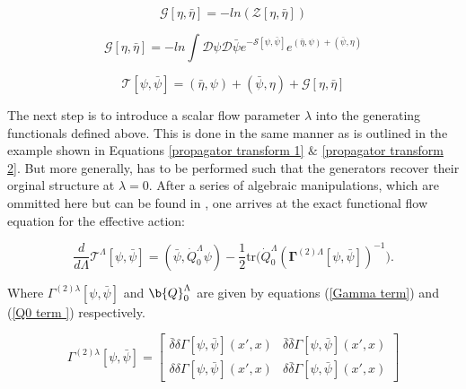 \documentclass[12pt]{article}
\begin{document}
\begin{equation} \label{Greens function functional}
    \mathcal{G}[\eta, \bar{\eta}] = -ln(\mathcal{Z}[\eta, \bar{\eta}])
\end{equation}

\begin{equation}\label{G term in effective action}
    \mathcal{G}[\eta, \bar{\eta}] = 
    -ln \int{\mathcal{D}\psi \mathcal{D} \bar{\psi}e^{-\mathcal{S}[\psi, \bar{\psi}]}e^{(\bar{\eta}, \psi) +(\bar{\psi}, \eta)}}
\end{equation}

\begin{equation} \label{Effective action}
    \mathcal{T}[\psi, \bar{\psi}] = (\bar{\eta},\psi) + (\bar{\psi},\eta) + \mathcal{G}[\eta, \bar{\eta}]
\end{equation}


\noindent The next step is to introduce a scalar flow parameter $\lambda$ into the generating functionals defined above. This is done in the same manner as is outlined in the example shown in Equations \ref{propagator transform 1} $\&$ \ref{propagator transform 2}. 
But more generally, has to be performed such that the generators recover their orginal structure at $\lambda = 0 $.
After a series of algebraic manipulations, which are ommitted here but can be found in \cite{metzner2012functional}, one arrives at the exact functional flow equation for the effective action:


\begin{equation} \label{eq:ExactFunctionalFlowEquation}
    \frac{d}{d\Lambda} \mathcal{T}^{\Lambda}[\psi, \bar{\psi}] = (\bar{\psi}, \dot{Q}_0^{\Lambda} \psi) - \frac{1}{2} \text{tr} \big( \dot{Q}_0^{\Lambda} (\boldsymbol{\Gamma}^{(2)\Lambda}[\psi, \bar{\psi}])^{-1} \big).
\end{equation}

\noindent Where $\Gamma^{(2)\lambda}[\psi, \bar{\psi}]$ and  $\b{Q}_0^{\Lambda}$ are given by equations (\ref{Gamma term}) and (\ref{Q0 term }) respectively.



\begin{equation}\label{Gamma term}
\Gamma^{(2)\lambda}[\psi, \bar{\psi}] = 
\begin{bmatrix}
\bar{\delta} \delta \Gamma[\psi, \bar{\psi}](x',x) & \bar{\delta} \bar{\delta} \Gamma[\psi, \bar{\psi}](x',x) \\
\delta \delta \Gamma[\psi, \bar{\psi}](x',x)  & \delta \bar{\delta} \Gamma[\psi, \bar{\psi}](x',x)
\end{bmatrix}
\end{equation}
\end{document}
